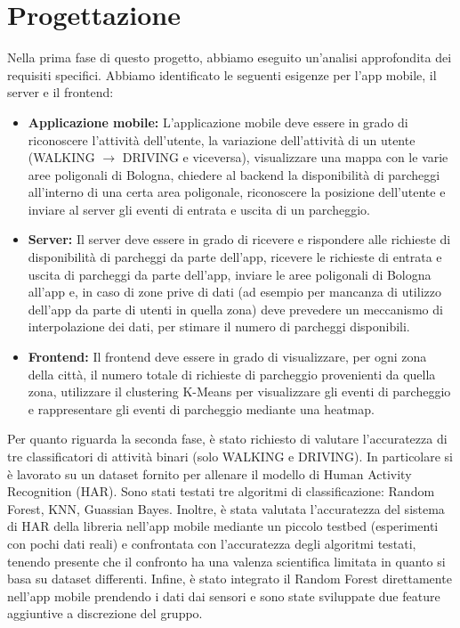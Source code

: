 \documentclass[../../Report.tex]{subfiles}
\begin{document}
    \chapter{Progettazione}
    Nella prima fase di questo progetto, abbiamo eseguito un'analisi approfondita dei requisiti specifici. Abbiamo identificato le seguenti esigenze per l'app mobile, il server e il frontend:
    \begin{itemize}
        \item \textbf{Applicazione mobile:} L'applicazione mobile deve essere in grado di riconoscere l'attività dell'utente, la variazione dell'attività di un utente (WALKING $\rightarrow$ DRIVING e viceversa), visualizzare una mappa con le varie aree poligonali di Bologna, chiedere al backend la disponibilità di parcheggi all'interno di una certa area poligonale, riconoscere la posizione dell'utente e inviare al server gli eventi di entrata e uscita di un parcheggio.
        \item \textbf{Server:} Il server deve essere in grado di ricevere e rispondere alle richieste di disponibilità di parcheggi da parte dell'app, ricevere le richieste di entrata e uscita di parcheggi da parte dell'app, inviare le aree poligonali di Bologna all'app e, in caso di zone prive di dati (ad esempio per mancanza di utilizzo dell'app da parte di utenti in quella zona) deve prevedere un meccanismo di interpolazione dei dati, per stimare il numero di parcheggi disponibili.
        \item \textbf{Frontend:} Il frontend deve essere in grado di visualizzare, per ogni zona della città, il numero totale di richieste di parcheggio provenienti da quella zona, utilizzare il clustering K-Means per visualizzare gli eventi di parcheggio e rappresentare gli eventi di parcheggio mediante una heatmap.
    \end{itemize}

    Per quanto riguarda la seconda fase, è stato richiesto di valutare l'accuratezza di tre classificatori di attività binari (solo WALKING e DRIVING). In particolare si è lavorato su un dataset fornito per allenare il modello di Human Activity Recognition (HAR). Sono stati testati tre algoritmi di classificazione: Random Forest, KNN, Guassian Bayes. Inoltre, è stata valutata l'accuratezza del sistema di HAR della libreria nell'app mobile mediante un piccolo testbed (esperimenti con pochi dati reali) e confrontata con l'accuratezza degli algoritmi testati, tenendo presente che il confronto ha una valenza scientifica limitata in quanto si basa su dataset differenti. Infine, è stato integrato il Random Forest direttamente nell'app mobile prendendo i dati dai sensori e sono state sviluppate due feature aggiuntive a discrezione del gruppo.\\
\end{document}
